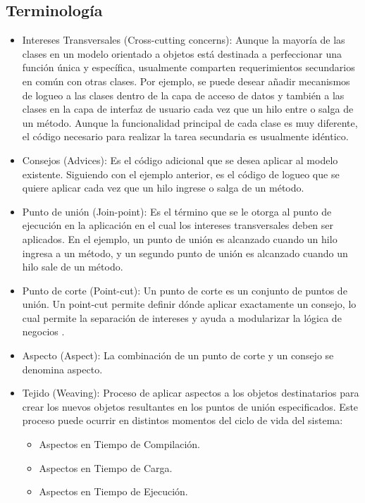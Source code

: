 \subsection{Terminología}
\label{sec:aop_terminologia}
\begin{itemize}
  \item Intereses Transversales (Cross-cutting concerns): Aunque la mayoría de
  las clases en un modelo orientado a objetos está destinada a perfeccionar una función única y
  específica, usualmente comparten requerimientos secundarios en común con otras
  clases. Por ejemplo, se puede desear añadir mecanismos de logueo a las clases
  dentro de la capa de acceso de datos y también a las clases en la capa de
  interfaz de usuario cada vez que un hilo entre o salga de un método. Aunque la
  funcionalidad principal de cada clase es muy diferente, el código necesario
  para realizar la tarea secundaria es usualmente
  idéntico.\cite{Introduction_To_Aspect}
  
  \item Consejos (Advices): Es el código adicional que se desea aplicar al
  modelo existente. Siguiendo con el ejemplo anterior, es el código de logueo
  que se quiere aplicar cada vez que un hilo ingrese o salga de un
  método.\cite{Introduction_To_Aspect}
  
  \item Punto de unión (Join-point): Es el término que se le otorga al punto
  de ejecución en la aplicación en el cual los intereses transversales deben ser
  aplicados. En el ejemplo, un punto de unión es alcanzado cuando un hilo
  ingresa a un método, y un segundo punto de unión es alcanzado cuando un hilo
  sale de un método.
  
  \item Punto de corte (Point-cut): Un punto de corte es un conjunto de puntos
  de unión. Un point-cut permite definir dónde aplicar exactamente un consejo,
  lo cual permite la separación de intereses y ayuda a modularizar la lógica de
  negocios \cite{Classification_Of_Pointcut_Language_Constructs}.
  
  \item Aspecto (Aspect): La combinación de un punto de corte y un consejo se
  denomina aspecto. \cite{Introduction_To_Aspect}
  
  \item Tejido (Weaving): Proceso de aplicar aspectos a los objetos
  destinatarios para crear los nuevos objetos resultantes en los puntos de
  unión especificados. Este proceso puede ocurrir en distintos momentos del
  ciclo de vida del sistema:
  	\begin{itemize}
		\item Aspectos en Tiempo de Compilación.
		\item Aspectos en Tiempo de Carga.
		\item Aspectos en Tiempo de Ejecución.
	\end{itemize}
\end{itemize} 